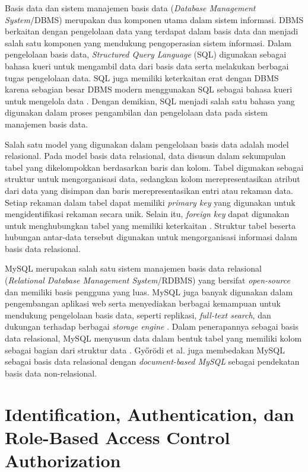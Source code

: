 Basis data dan sistem manajemen basis data (\textit{Database Management System}/DBMS) merupakan dua komponen utama dalam sistem informasi. DBMS berkaitan dengan pengelolaan data yang terdapat dalam basis data dan menjadi salah satu komponen yang mendukung pengoperasian sistem informasi. Dalam pengelolaan basis data, \textit{Structured Query Language} (SQL) digunakan sebagai bahasa kueri untuk mengambil data dari basis data serta melakukan berbagai tugas pengelolaan data. SQL juga memiliki keterkaitan erat dengan DBMS karena sebagian besar DBMS modern menggunakan SQL sebagai bahasa kueri untuk mengelola data \parencite{Taipalus2021}. Dengan demikian, SQL menjadi salah satu bahasa yang digunakan dalam proses pengambilan dan pengelolaan data pada sistem manajemen basis data.

Salah satu model yang digunakan dalam pengelolaan basis data adalah model relasional. Pada model basis data relasional, data disusun dalam sekumpulan tabel yang dikelompokkan berdasarkan baris dan kolom. Tabel digunakan sebagai struktur untuk mengorganisasi data, sedangkan kolom merepresentasikan atribut dari data yang disimpan dan baris merepresentasikan entri atau rekaman data. Setiap rekaman dalam tabel dapat memiliki \textit{primary key} yang digunakan untuk mengidentifikasi rekaman secara unik. Selain itu, \textit{foreign key} dapat digunakan untuk menghubungkan tabel yang memiliki keterkaitan \parencite{Bonteanu2024}. Struktur tabel beserta hubungan antar-data tersebut digunakan untuk mengorganisasi informasi dalam basis data relasional.

MySQL merupakan salah satu sistem manajemen basis data relasional (\textit{Relational Database Management System}/RDBMS) yang bersifat \textit{open-source} dan memiliki basis pengguna yang luas. MySQL juga banyak digunakan dalam pengembangan aplikasi web serta menyediakan berbagai kemampuan untuk mendukung pengelolaan basis data, seperti replikasi, \textit{full-text search}, dan dukungan terhadap berbagai \textit{storage engine} \parencite{Bonteanu2024}. Dalam penerapannya sebagai basis data relasional, MySQL menyusun data dalam bentuk tabel yang memiliki kolom sebagai bagian dari struktur data \parencite{Gyrdi2021}. Győrödi et al. juga membedakan MySQL sebagai basis data relasional dengan \textit{document-based MySQL} sebagai pendekatan basis data non-relasional.

\section{Identification, Authentication, dan Role-Based Access Control Authorization}

